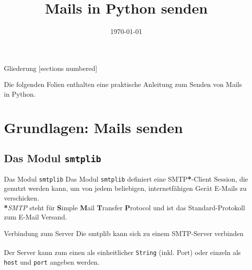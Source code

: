 



\title{Mails in Python senden}
\date{\today}




\maketitle

\begin{frame}{Gliederung}
	[sections numbered]
	\tableofcontents
\end{frame}

\begin{frame}
	Die folgenden Folien enthalten eine praktische Anleitung zum Senden von Mails in Python.
\end{frame}


\section{Grundlagen: Mails senden}
\subsection{Das Modul \texttt{smtplib}}
\begin{frame}[fragile]{Das Modul \texttt{smtplib}}
	Das Modul \texttt{\alert{smtplib}} definiert eine SMTP\textbf{*}-Client Session, die genutzt werden kann, um von jedem beliebigen, internetf\"ahigen Ger\"at E-Mails zu verschicken. \\[1cm]
	
	\textbf{*}\textit{SMTP} steht für \textbf{S}imple \textbf{M}ail \textbf{T}ransfer 
	\textbf{P}rotocol und ist das Standard-Protokoll zum E-Mail Versand.
\end{frame}

\begin{frame}[fragile]{Verbindung zum Server}
	Die smtplib kann sich zu einem SMTP-Server verbinden\\[.5cm]
	
	
	\ \\[.25cm]
	Der Server kann zum einen als einheitlicher \texttt{String} (inkl. Port) oder einzeln als \texttt{host} und \texttt{port} angeben werden.
\end{frame}

